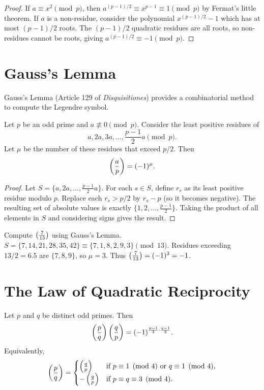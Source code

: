 \begin{proof}
If $a \equiv x^2 \pmod{p}$, then $a^{(p-1)/2} \equiv x^{p-1} \equiv 1 \pmod{p}$ by Fermat's little theorem. If $a$ is a non-residue, consider the polynomial $x^{(p-1)/2} - 1$ which has at most $(p-1)/2$ roots. The $(p-1)/2$ quadratic residues are all roots, so non-residues cannot be roots, giving $a^{(p-1)/2} \equiv -1 \pmod{p}$.
\end{proof}

\section{Gauss's Lemma}

Gauss's Lemma (Article 129 of \textit{Disquisitiones}) provides a combinatorial method to compute the Legendre symbol.

\begin{theorem}
Let $p$ be an odd prime and $a \not\equiv 0 \pmod{p}$. Consider the least positive residues of
\[
a, 2a, 3a, \ldots, \frac{p-1}{2}a \pmod{p}.
\]
Let $\mu$ be the number of these residues that exceed $p/2$. Then
\[
\left(\frac{a}{p}\right) = (-1)^\mu.
\]
\end{theorem}

\begin{proof}
Let $S = \{a, 2a, \ldots, \frac{p-1}{2}a\}$. For each $s \in S$, define $r_s$ as its least positive residue modulo $p$. Replace each $r_s > p/2$ by $r_s - p$ (so it becomes negative). The resulting set of absolute values is exactly $\{1, 2, \ldots, \frac{p-1}{2}\}$. Taking the product of all elements in $S$ and considering signs gives the result.
\end{proof}

\begin{example}
Compute $\left(\frac{7}{13}\right)$ using Gauss's Lemma.
$S = \{7, 14, 21, 28, 35, 42\} \equiv \{7, 1, 8, 2, 9, 3\} \pmod{13}$.
Residues exceeding $13/2 = 6.5$ are $\{7, 8, 9\}$, so $\mu = 3$.
Thus $\left(\frac{7}{13}\right) = (-1)^3 = -1$.
\end{example}

\section{The Law of Quadratic Reciprocity}

\begin{theorem}
Let $p$ and $q$ be distinct odd primes. Then
\[
\left(\frac{p}{q}\right) \left(\frac{q}{p}\right) = (-1)^{\frac{p-1}{2} \cdot \frac{q-1}{2}}.
\]
Equivalently,
\[
\left(\frac{p}{q}\right) = 
\begin{cases}
\left(\frac{q}{p}\right) & \text{if } p \equiv 1 \pmod{4} \text{ or } q \equiv 1 \pmod{4}, \\
-\left(\frac{q}{p}\right) & \text{if } p \equiv q \equiv 3 \pmod{4}.
\end{cases}
\]
\end{theorem}

